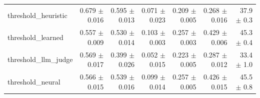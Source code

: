 \begin{table}[t]
\begin{tabular}{lrrrrrr}
threshold\_heuristic & 0.679 $\pm$ 0.016 & 0.595 $\pm$ 0.013 & 0.071 $\pm$ 0.023 & 0.209 $\pm$ 0.005 & 0.268 $\pm$ 0.016 & 37.9 $\pm$ 0.3 \\
threshold\_learned & 0.557 $\pm$ 0.009 & 0.530 $\pm$ 0.014 & 0.103 $\pm$ 0.003 & 0.257 $\pm$ 0.003 & 0.429 $\pm$ 0.006 & 45.3 $\pm$ 0.4 \\
threshold\_llm\_judge & 0.569 $\pm$ 0.017 & 0.399 $\pm$ 0.026 & 0.052 $\pm$ 0.015 & 0.223 $\pm$ 0.005 & 0.287 $\pm$ 0.012 & 33.4 $\pm$ 1.0 \\
threshold\_neural & 0.566 $\pm$ 0.015 & 0.539 $\pm$ 0.016 & 0.099 $\pm$ 0.014 & 0.257 $\pm$ 0.005 & 0.426 $\pm$ 0.015 & 45.5 $\pm$ 0.8 \\
\bottomrule
\end{tabular}
\end{table}
